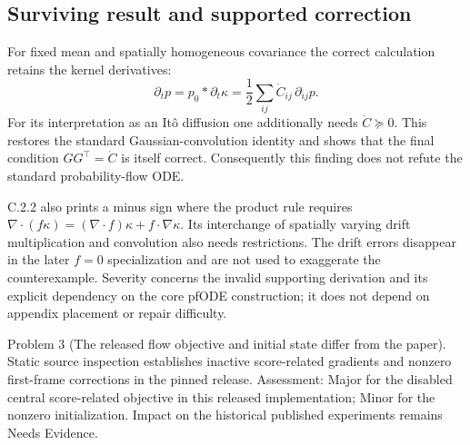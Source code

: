 \documentclass[10pt]{article}
\begin{document}
\subsection*{Surviving result and supported correction}
For fixed mean and spatially homogeneous covariance the correct calculation retains the kernel derivatives: \[\partial_t p=p_0*\partial_t\kappa
 =\frac12\sum_{ij}\dot C_{ij}\,\partial_{ij}p.\] For its interpretation as an Itô diffusion one additionally needs \(\dot C\succeq0\). This restores the standard Gaussian-convolution identity and shows that the final condition \(GG^\top=\dot C\) is itself correct. Consequently this finding does not refute the standard probability-flow ODE.\par
C.2.2 also prints a minus sign where the product rule requires \(\nabla\cdot(f\kappa)=(\nabla\cdot f)\kappa+f\cdot\nabla\kappa\). Its interchange of spatially varying drift multiplication and convolution also needs restrictions. The drift errors disappear in the later \(f=0\) specialization and are not used to exaggerate the counterexample. Severity concerns the invalid supporting derivation and its explicit dependency on the core pfODE construction; it does not depend on appendix placement or repair difficulty.\par
Problem 3 (The released flow objective and initial state differ from the paper).  Static source inspection establishes inactive score-related gradients and nonzero first-frame corrections in the pinned release. Assessment: Major for the disabled central score-related objective in this released implementation; Minor for the nonzero initialization. Impact on the historical published experiments remains Needs Evidence.\par
\end{document}
